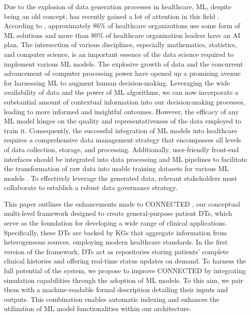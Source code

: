 Due to the explosion of data generation processes in healthcare, ML, despite being an old concept, has recently gained a lot of attention in this field \cite{javaid_significance_2022}. According to \cite{alanazi_using_2022}, approximately 86\% of healthcare
organizations use some form of ML solutions and more than 80\% of
healthcare organization leaders have an AI plan. The intersection of various disciplines, especially mathematics, statistics, and computer science, is an important essence of the data science
required to implement various ML models. The explosive growth of data and the concurrent advancement of computer processing power have opened up a promising avenue for harnessing ML to augment human decision-making. Leveraging the wide availability of data and the power of ML algorithms, we can now incorporate a substantial amount of contextual information into our decision-making processes, leading to more informed and insightful outcomes. However, the efficacy of any ML model hinges on the quality and representativeness of the data employed to train it. Consequently, the successful integration of ML models into healthcare requires a comprehensive data management strategy that encompasses all levels of data collection, storage, and processing. Additionally, user-friendly front-end interfaces should be integrated into data processing and ML pipelines to facilitate the transformation of raw data into usable training datasets for various ML models \cite{menghani_efficient_2023}. To effectively leverage the generated data, relevant stakeholders must collaborate to establish a robust data governance strategy.

This paper outlines the enhancements made to CONNECTED \cite{10.3389/fdgth.2023.1322428_carbonaro_connected}, our conceptual multi-level framework designed to create general-purpose patient DTs, which serve as the foundation for developing a wide range of clinical applications. Specifically, these DTs are backed by KGs that aggregate information from heterogeneous sources, employing modern healthcare standards. In the first version of the framework, DTs act as repositories storing patients' complete clinical histories and offering real-time status updates on demand. To harness the full potential of the system, we propose to improve CONNECTED by integrating simulation capabilities through the adoption of ML models. To this aim, we pair them with a machine-readable formal description detailing their inputs and outputs. This combination enables automatic indexing and enhances the utilization of ML model functionalities within our architecture.

